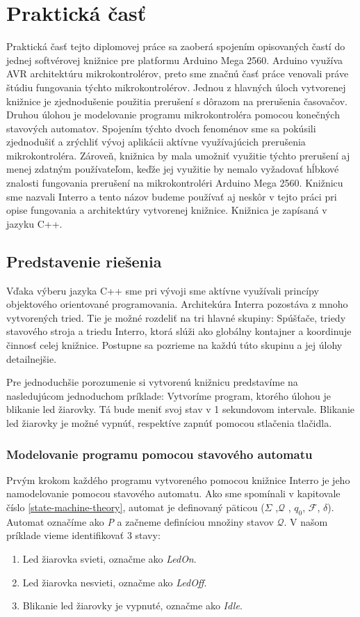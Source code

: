 \section{Praktická časť}
\noindent

Praktická časť tejto diplomovej práce sa zaoberá spojením opisovaných častí do jednej softvérovej knižnice pre platformu Arduino Mega 2560. Arduino využíva AVR
architektúru mikrokontrolérov, preto sme značnú časť práce venovali práve štúdiu fungovania týchto mikrokontrolérov.
Jednou z hlavných úloch vytvorenej knižnice je zjednodušenie použitia prerušení s dôrazom na prerušenia časovačov.
Druhou úlohou je modelovanie programu mikrokontroléra pomocou konečných stavových automatov. Spojením týchto dvoch fenoménov sme sa pokúsili zjednodušiť
a zrýchliť vývoj aplikácii aktívne využívajúcich prerušenia mikrokontroléra. Zároveň, knižnica by mala umožniť využitie týchto prerušení aj menej zdatným
používateľom, keďže jej využitie by nemalo vyžadovať hĺbkové znalosti fungovania prerušení na mikrokontroléri Arduino Mega 2560. Knižnicu sme nazvali Interro
a tento názov budeme používať aj neskôr v tejto práci pri opise fungovania a architektúry vytvorenej knižnice. Knižnica je zapísaná v jazyku C++.

\subsection{Predstavenie riešenia}
\noindent
Vďaka výberu jazyka C++ sme pri vývoji sme aktívne využívali princípy objektového orientované programovania. Architekúra Interra pozostáva z mnoho vytvorených tried.
Tie je možné rozdeliť na tri hlavné skupiny: Spúšťače, triedy stavového stroja a triedu Interro, ktorá slúži ako globálny kontajner a koordinuje činnosť celej knižnice.
Postupne sa pozrieme na každú túto skupinu a jej úlohy detailnejšie. \par
Pre jednoduchšie porozumenie si vytvorenú knižnicu predstavíme na nasledujúcom jednoduchom príklade: Vytvoríme program, ktorého úlohou je blikanie led žiarovky.
Tá bude meniť svoj stav v 1 sekundovom intervale. Blikanie led žiarovky je možné vypnúť, respektíve zapnúť pomocou stlačenia tlačidla.

\subsubsection{Modelovanie programu pomocou stavového automatu}
\noindent
Prvým krokom každého programu vytvoreného pomocou knižnice Interro je jeho namodelovanie pomocou stavového automatu.
Ako sme spomínali v kapitovale číslo \ref{state-machine-theory}, automat je definovaný päticou ($\Sigma$ ,$\mathcal{Q}$ , $q_0$, $\mathcal{F}$, $\delta$).
Automat označíme ako \textit{P} a začneme definíciou množiny stavov $\mathcal{Q}$. V našom príklade vieme identifikovať 3 stavy:
\begin{enumerate}
    \item Led žiarovka svieti, označme ako \textit{LedOn}.
    \item Led žiarovka nesvieti, označme ako \textit{LedOff}.
    \item Blikanie led žiarovky je vypnuté, označme ako \textit{Idle}.
\end{enumerate}

